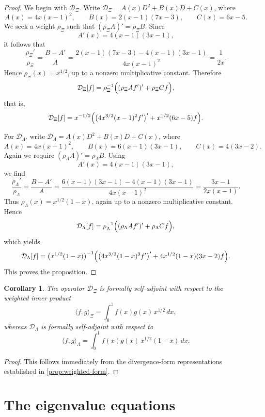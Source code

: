 \documentclass[11pt,twoside]{article}
\newtheorem{corollary}[theorem]{Corollary}
\numberwithin{equation}{section}
\begin{document}
\begin{proof}
We begin with \(\mathcal D_{\Xi}\). Write \(\mathcal D_{\Xi}=A(x)D^2+B(x)D+C(x)\), where
\[
A(x)=4x(x-1)^2,\qquad B(x)=2(x-1)(7x-3),\qquad C(x)=6x-5.
\]
We seek a weight \(\rho_{\Xi}\) such that \((\rho_{\Xi}A)'=\rho_{\Xi}B\). Since
\[
A'(x)=4(x-1)(3x-1),
\]
it follows that
\[
\frac{\rho_{\Xi}'}{\rho_{\Xi}}
=
\frac{B-A'}{A}
=
\frac{2(x-1)(7x-3)-4(x-1)(3x-1)}{4x(x-1)^2}
=
\frac{1}{2x}.
\]
Hence \(\rho_{\Xi}(x)=x^{1/2}\), up to a nonzero multiplicative constant. Therefore
\[
\mathcal D_{\Xi}[f]
=
\rho_{\Xi}^{-1}
\Bigl(
(\rho_{\Xi}A f')'
+
\rho_{\Xi}Cf
\Bigr),
\]
that is,
\[
\mathcal D_{\Xi}[f]
=
x^{-1/2}
\Bigl(
\bigl(4x^{3/2}(x-1)^2f'\bigr)'
+
x^{1/2}(6x-5)f
\Bigr).
\]

For \(\mathcal D_{\Lambda}\), write \(\mathcal D_{\Lambda}=A(x)D^2+B(x)D+C(x)\), where
\[
A(x)=4x(x-1)^2,\qquad B(x)=6(x-1)(3x-1),\qquad C(x)=4(3x-2).
\]
Again we require \((\rho_{\Lambda}A)'=\rho_{\Lambda}B\). Using
\[
A'(x)=4(x-1)(3x-1),
\]
we find
\[
\frac{\rho_{\Lambda}'}{\rho_{\Lambda}}
=
\frac{B-A'}{A}
=
\frac{6(x-1)(3x-1)-4(x-1)(3x-1)}{4x(x-1)^2}
=
\frac{3x-1}{2x(x-1)}.
\]
Thus \(\rho_{\Lambda}(x)=x^{1/2}(1-x)\), again up to a nonzero multiplicative constant. Hence
\[
\mathcal D_{\Lambda}[f]
=
\rho_{\Lambda}^{-1}
\Bigl(
(\rho_{\Lambda}A f')'
+
\rho_{\Lambda}Cf
\Bigr),
\]
which yields
\[
\mathcal D_{\Lambda}[f]
=
\bigl(x^{1/2}(1-x)\bigr)^{-1}
\Bigl(
\bigl(4x^{3/2}(1-x)^3f'\bigr)'
+
4x^{1/2}(1-x)(3x-2)f
\Bigr).
\]
This proves the proposition.
\end{proof}

\begin{corollary}\label{cor:formal-selfadjoint}
The operator \(\mathcal D_{\Xi}\) is formally self-adjoint with respect to the weighted inner product
\[
\langle f,g\rangle_{\Xi}
=
\int_0^1 f(x)g(x)\,x^{1/2}\,dx,
\]
whereas \(\mathcal D_{\Lambda}\) is formally self-adjoint with respect to
\[
\langle f,g\rangle_{\Lambda}
=
\int_0^1 f(x)g(x)\,x^{1/2}(1-x)\,dx.
\]
\end{corollary}

\begin{proof}
This follows immediately from the divergence-form representations established in \cref{prop:weighted-form}.
\end{proof}

\section{The eigenvalue equations}
\end{document}
